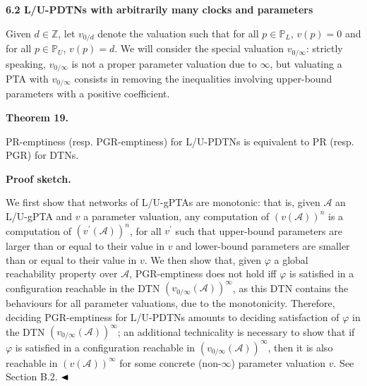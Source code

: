 
 
\par\medskip\noindent\textbf{6.2 L/U-PDTNs with arbitrarily many clocks and parameters}\par
 
 
Given $d\in\mathbb{Z}$, let $v_{0/d}$ denote the valuation such that for all $p\in\mathbb{P}_{L}$, $v(p)=0$ and for all $p\in\mathbb{P}_{U}$, $v(p)=d$. We will consider the special valuation $v_{0/\infty}$: strictly speaking, $v_{0/\infty}$ is not a proper parameter valuation due to $\infty$, but valuating a PTA with $v_{0/\infty}$ consists in removing the inequalities involving upper-bound parameters with a positive coefficient.\par
 
 
 
\par\medskip\noindent\textbf{Theorem 19.}\par
 
 
PR-emptiness (resp. PGR-emptiness) for L/U-PDTNs is equivalent to PR (resp. PGR) for DTNs.\par
 
 
 
 
\par\medskip\noindent\textbf{Proof sketch.}\par
 
 
We first show that networks of L/U-gPTAs are monotonic: that is, given $\mathcal{A}$ an L/U-gPTA and $v$ a parameter valuation, any computation of ${(v(\mathcal{A}))}^{n}$ is a computation of ${(v^{\prime}(\mathcal{A}))}^{n}$, for all $v^{\prime}$ such that upper-bound parameters are larger than or equal to their value in $v$ and lower-bound parameters are smaller than or equal to their value in $v$. We then show that, given $\varphi$ a global reachability property over $\mathcal{A}$, PGR-emptiness does not hold iff $\varphi$ is satisfied in a configuration reachable in the DTN ${(v_{0/\infty}(\mathcal{A}))}^{\infty}$, as this DTN contains the behaviours for all parameter valuations, due to the monotonicity. Therefore, deciding PGR-emptiness for L/U-PDTNs amounts to deciding satisfaction of $\varphi$ in the DTN ${(v_{0/\infty}(\mathcal{A}))}^{\infty}$; an additional technicality is necessary to show that if $\varphi$ is satisfied in a configuration reachable in ${(v_{0/\infty}(\mathcal{A}))}^{\infty}$, then it is also reachable in ${(v(\mathcal{A}))}^{\infty}$ for some concrete (non-$\infty$) parameter valuation $v$. See Section B.2. $\hfill\blacktriangleleft$\par
 
